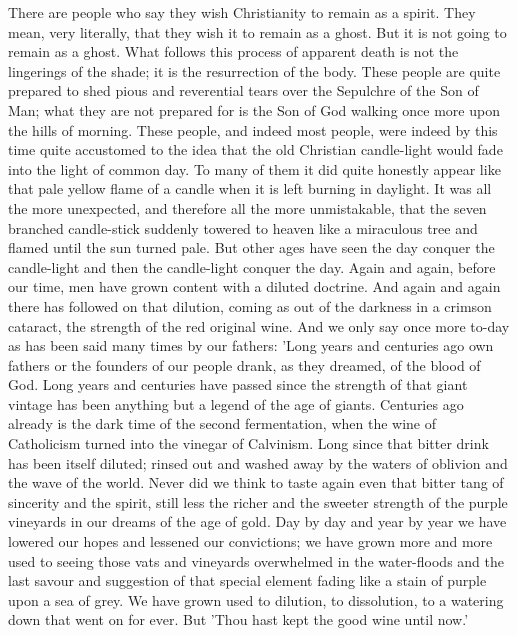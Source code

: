 There are people who say they wish Christianity to remain as a spirit. They mean, very literally, that they wish it to remain as a ghost. But it is not going to remain as a ghost. What follows this process of apparent death is not the lingerings of the shade; it is the resurrection of the body. These people are quite prepared to shed pious and reverential tears over the Sepulchre of the Son of Man; what they are not prepared for is the Son of God walking once more upon the hills of morning. These people, and indeed most people, were indeed by this time quite accustomed to the idea that the old Christian candle-light would fade into the light of common day. To many of them it did quite honestly appear like that pale yellow flame of a candle when it is left burning in daylight. It was all the more unexpected, and therefore all the more unmistakable, that the seven branched candle-stick suddenly towered to heaven like a miraculous tree and flamed until the sun turned pale. But other ages have seen the day conquer the candle-light and then the candle-light conquer the day. Again and again, before our time, men have grown content with a diluted doctrine. And again and again there has followed on that dilution, coming as out of the darkness in a crimson cataract, the strength of the red original wine. And we only say once more to-day as has been said many times by our fathers: 'Long years and centuries ago own fathers or the founders of our people drank, as they dreamed, of the blood of God. Long years and centuries have passed since the strength of that giant vintage has been anything but a legend of the age of giants. Centuries ago already is the dark time of the second fermentation, when the wine of Catholicism turned into the vinegar of Calvinism. Long since that bitter drink has been itself diluted; rinsed out and washed away by the waters of oblivion and the wave of the world. Never did we think to taste again even that bitter tang of sincerity and the spirit, still less the richer and the sweeter strength of the purple vineyards in our dreams of the age of gold. Day by day and year by year we have lowered our hopes and lessened our convictions; we have grown more and more used to seeing those vats and vineyards overwhelmed in the water-floods and the last savour and suggestion of that special element fading like a stain of purple upon a sea of grey. We have grown used to dilution, to dissolution, to a watering down that went on for ever. But 'Thou hast kept the good wine until now.'

